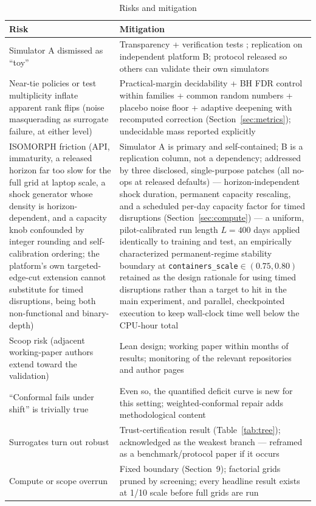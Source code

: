 \documentclass[12pt,a4paper]{article}
\begin{document}
\begin{table}[H]
\centering
\caption{Risks and mitigation}
\label{tab:risks}
\footnotesize
\begin{tabular}{p{4.6cm}p{9.6cm}}
\toprule
\textbf{Risk} & \textbf{Mitigation} \\
\midrule
Simulator A dismissed as ``toy'' & Transparency + verification tests \citep{law2015}; replication on independent platform B; protocol released so others can validate their own simulators \\
\midrule
Near-tie policies or test multiplicity inflate apparent rank flips (noise masquerading as surrogate failure, at either level) & Practical-margin decidability + BH FDR control within families + common random numbers + placebo noise floor + adaptive deepening with recomputed correction (Section~\ref{sec:metrics}); undecidable mass reported explicitly \\
\midrule
ISOMORPH friction (API, immaturity, a released horizon far too slow for the full grid at laptop scale, a shock generator whose density is horizon-dependent, and a capacity knob confounded by integer rounding and self-calibration ordering; the platform's own targeted-edge-cut extension cannot substitute for timed disruptions, being both non-functional and binary-depth) & Simulator A is primary and self-contained; B is a replication column, not a dependency; addressed by three disclosed, single-purpose patches (all no-ops at released defaults) --- horizon-independent shock duration, permanent capacity rescaling, and a scheduled per-day capacity factor for timed disruptions (Section~\ref{sec:compute}) --- a uniform, pilot-calibrated run length $L=400$ days applied identically to training and test, an empirically characterized permanent-regime stability boundary at \texttt{containers\_scale}$\in(0.75,0.80)$ retained as the design rationale for using timed disruptions rather than a target to hit in the main experiment, and parallel, checkpointed execution to keep wall-clock time well below the CPU-hour total \\
\midrule
Scoop risk (adjacent working-paper authors extend toward the validation) & Lean design; working paper within months of results; monitoring of the relevant repositories and author pages \\
\midrule
``Conformal fails under shift'' is trivially true & Even so, the quantified deficit curve is new for this setting; weighted-conformal repair \citep{tibshirani2019} adds methodological content \\
\midrule
Surrogates turn out robust & Trust-certification result (Table~\ref{tab:tree}); acknowledged as the weakest branch --- reframed as a benchmark/protocol paper if it occurs \\
\midrule
Compute or scope overrun & Fixed boundary (Section~9); factorial grids pruned by screening; every headline result exists at 1/10 scale before full grids are run \\
\bottomrule
\end{tabular}
\end{table}
\end{document}
